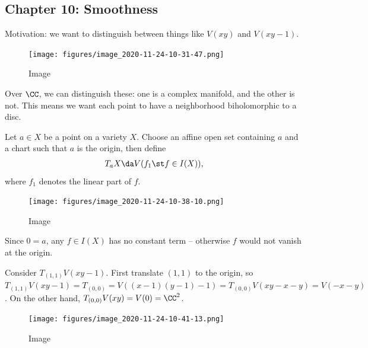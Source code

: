 \hypertarget{chapter-10-smoothness}{%
\subsection{Chapter 10: Smoothness}\label{chapter-10-smoothness}}

Motivation: we want to distinguish between things like \(V(xy)\) and
\(V(xy-1)\).

\begin{figure}
\centering
\texttt{[image: figures/image\_2020-11-24-10-31-47.png]}
\caption{Image}
\end{figure}

Over \(\CC\), we can distinguish these: one is a complex manifold, and
the other is not. This means we want each point to have a neighborhood
biholomorphic to a disc.

\begin{definition}

Let \(a\in X\) be a point on a variety \(X\). Choose an affine open set
containing \(a\) and a chart such that \(a\) is the origin, then define
\begin{align*}  
T_a X \da V(f_1 \st f\in I(X))
,\end{align*} where \(f_1\) denotes the linear part of \(f\).

\begin{figure}
\centering
\texttt{[image: figures/image\_2020-11-24-10-38-10.png]}
\caption{Image}
\end{figure}

\end{definition}

\begin{remark}

Since \(0=a\), any \(f\in I(X)\) has no constant term -- otherwise \(f\)
would not vanish at the origin.

\end{remark}

\begin{example}[?]

Consider \(T_{(1, 1)} V(xy-1)\). First translate \((1, 1)\) to the
origin, so
\(T_{(1, 1)} V(xy-1) = T_{(0, 0)} = V((x-1)(y-1) - 1) = T_{(0, 0)} V(xy-x-y) = V(-x-y)\).
On the other hand, \(T_{(0, 0)} V(xy) = V(0) = \CC^2\).

\begin{figure}
\centering
\texttt{[image: figures/image\_2020-11-24-10-41-13.png]}
\caption{Image}
\end{figure}

\end{example}

